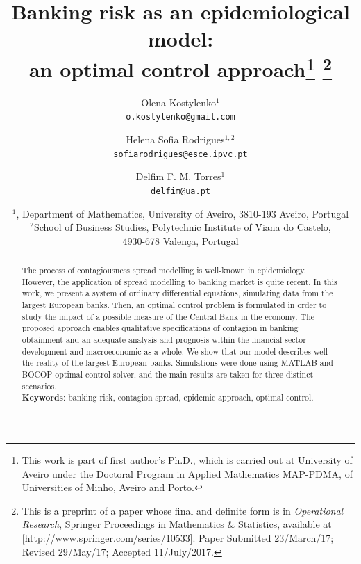 \documentclass[a4paper,10pt,twoside]{article}
\begin{document}
	
\title{Banking risk as an epidemiological model:\\ an optimal control approach\thanks{This 
work is part of first author's Ph.D., which is carried out at University of Aveiro
under the Doctoral Program in Applied Mathematics MAP-PDMA, 
of Universities of Minho, Aveiro and Porto.}
\thanks{This is a preprint of a paper whose final and definite form is in
\emph{Operational Research}, Springer Proceedings in Mathematics \& Statistics, 
available at [http://www.springer.com/series/10533]. 
Paper Submitted 23/March/17; Revised 29/May/17; Accepted 11/July/2017.}}
	
\author{Olena Kostylenko$^{1}$\\
{\tt \small o.kostylenko@gmail.com}
\and Helena Sofia Rodrigues$^{1,2}$\\
{\tt \small sofiarodrigues@esce.ipvc.pt}
\and Delfim F. M. Torres$^1$\\
{\tt \small delfim@ua.pt}}


\date{$^1${},
Department of Mathematics, University of Aveiro, 3810-193 Aveiro, Portugal\\[0.1cm]
$^2$School of Business Studies, Polytechnic Institute of Viana do Castelo,\\
4930-678 Valença, Portugal}

\maketitle


\begin{abstract}
\noindent The process of contagiousness spread modelling is well-known in epidemiology. 
However, the application of spread modelling to banking market is quite recent. In this work, 
we present a system of ordinary differential equations, simulating data from the largest European banks. 
Then, an optimal control problem is formulated in order to study the impact of a possible 
measure of the Central Bank in the economy. The proposed approach enables qualitative 
specifications of contagion in banking obtainment and an adequate analysis and prognosis 
within the financial sector development and macroeconomic as a whole. We show that 
our model describes well the reality of the largest European banks. Simulations 
were done using \textsf{MATLAB} and \textsf{BOCOP} optimal control solver, 
and the main results are taken for three distinct scenarios.\\
			
\noindent \textbf{Keywords}: banking risk, contagion spread, epidemic approach, optimal control.
\end{abstract}		
\end{document}
